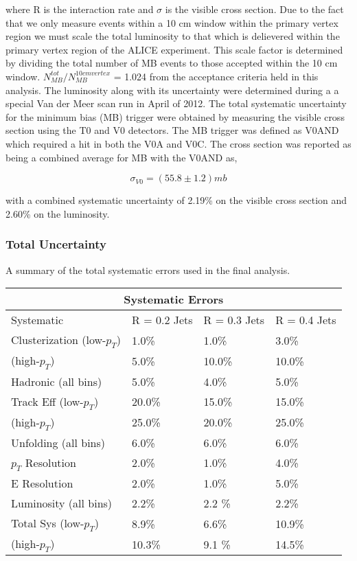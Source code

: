\noindent
where R is the interaction rate and $\sigma$ is the visible cross section.  Due to the fact that we only measure events within a 10 cm window within the primary vertex region we must scale the total luminosity to that which is delievered within the primary vertex region of the ALICE experiment.  This scale factor is determined by dividing the total number of MB events to those accepted within the 10 cm window.  $N^{tot}_{MB} / N^{10 cm vertex}_{MB}$ = 1.024 from the acceptance criteria held in this analysis.
The luminosity along with its uncertainty were determined during a a special Van der Meer scan run in April of 2012\cite{ALICE-PUBLIC-2017-002}.  The total systematic uncertainty for the minimum bias (MB) trigger were obtained by measuring the visible cross section using the T0 and V0 detectors.  The MB trigger was defined as V0AND which required a hit in both the V0A and V0C.  The cross section was reported as being a combined average for MB with the V0AND as, 

\begin{equation}
\sigma_{V0} = (55.8 \pm 1.2) mb
\label{eq:xlumdef}
\end{equation}

\noindent
with a combined systematic uncertainty of 2.19\% on the visible cross section and 2.60\% on the luminosity. 


\subsubsection{Total Uncertainty}

A summary of the total systematic errors used in the final analysis.

\begin{tabular}{ |p{5cm}||p{3cm}|p{3cm}|p{3cm}|  }
 \hline
 \multicolumn{4}{|c|}{Systematic Errors} \\
 \hline
 Systematic &R = 0.2 Jets & R = 0.3 Jets& R = 0.4 Jets\\
 \hline
Clusterization (low-$p_{T}$) & 1.0\%    &1.0\%&  3.0\%\\
 (high-$p_{T}$)           &  5.0\%  & 10.0\%   &  10.0\%\\
Hadronic (all bins)&   5.0\% & 4.0\% & 5.0\%\\
Track Eff (low-$p_{T}$)&20.0\% & 15.0\% & 15.0\%\\
 (high-$p_{T}$)            &  25.0\%  & 20.0\%   &  25.0\%\\
Unfolding (all bins)& 6.0\% & 6.0\%&  6.0\%\\
$p_{T}$ Resolution & 2.0\% & 1.0\% & 4.0\%\\
E Resolution& 2.0\%   &1.0\% & 5.0\%\\
Luminosity (all bins) & 2.2\%  & 2.2 \% & 2.2\%\\
 \hline
 \hline
Total Sys (low-$p_{T}$) & 8.9\%  & 6.6\% & 10.9\%\\
(high-$p_{T}$) & 10.3\%  & 9.1 \% & 14.5\%\\
\hline
\end{tabular}

